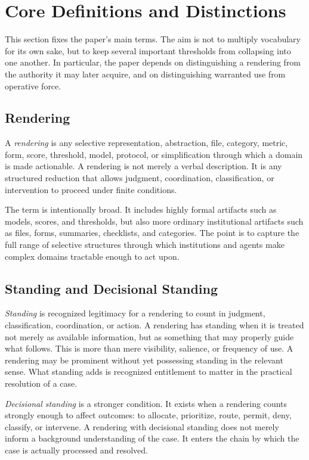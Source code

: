 \documentclass[11pt]{article}
\renewcommand{\emph}[1]{\textit{#1}}
\begin{document}
\section{Core Definitions and Distinctions}

This section fixes the paper's main terms. The aim is not to multiply vocabulary for its own sake, but to keep several important thresholds from collapsing into one another. In particular, the paper depends on distinguishing a rendering from the authority it may later acquire, and on distinguishing warranted use from operative force.

\subsection{Rendering}

A \emph{rendering} is any selective representation, abstraction, file, category, metric, form, score, threshold, model, protocol, or simplification through which a domain is made actionable. A rendering is not merely a verbal description. It is any structured reduction that allows judgment, coordination, classification, or intervention to proceed under finite conditions.\cite{Simon1996SciencesArtificial,FriggNguyen2020ModellingNature,Swanson2026ConstrainedDescribability}

The term is intentionally broad. It includes highly formal artifacts such as models, scores, and thresholds, but also more ordinary institutional artifacts such as files, forms, summaries, checklists, and categories. The point is to capture the full range of selective structures through which institutions and agents make complex domains tractable enough to act upon.

\subsection{Standing and Decisional Standing}

\emph{Standing} is recognized legitimacy for a rendering to count in judgment, classification, coordination, or action. A rendering has standing when it is treated not merely as available information, but as something that may properly guide what follows. This is more than mere visibility, salience, or frequency of use. A rendering may be prominent without yet possessing standing in the relevant sense. What standing adds is recognized entitlement to matter in the practical resolution of a case.

\emph{Decisional standing} is a stronger condition. It exists when a rendering counts strongly enough to affect outcomes: to allocate, prioritize, route, permit, deny, classify, or intervene. A rendering with decisional standing does not merely inform a background understanding of the case. It enters the chain by which the case is actually processed and resolved.
\end{document}
